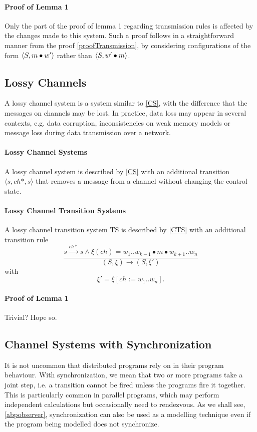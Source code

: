 \paragraph{Proof of Lemma 1}
Only the part of the proof of lemma 1 regarding transmission rules is affected by the changes made to this system. Such a proof follows in a straightforward manner from the proof \ref{proofTransmission}, by considering configurations of the form  $\langle S, m\bullet w'\rangle$ rather than $\langle S, w'\bullet m\rangle$.

\subsection{Lossy Channels}
A lossy channel system is a system similar to \ref{CS}, with the difference that the messages on channels may be lost. In practice, data loss may appear in several contexts, e.g. data corruption, inconsistencies on weak memory models or message loss during data transmission over a network.

\paragraph{Lossy Channel Systems}
A lossy channel system is described by \ref{CS} with an additional transition $\langle s, ch*, s\rangle$ that removes a message from a channel without changing the control state.

\paragraph{Lossy Channel Transition Systems}
A lossy channel transition system TS is described by \ref{CTS} with an additional transition rule
      \[
      \dfrac{s \xrightarrow{ch*} s \wedge \xi(ch) = w_1..w_{k-1}\bullet m \bullet w_{k+1}..w_n}{(S, \xi) \rightarrow (S, \xi')} \] with \[ \xi' = \xi[ch:= w_1..w_n].
      \]

\paragraph{Proof of Lemma 1}
Trivial?  Hope so.

\subsection{Channel Systems with Synchronization}
It is not uncommon that distributed programs rely on  in their program behaviour. With synchronization, we mean that two or more programs take a joint step, i.e. a transition cannot be fired unless the programs fire it together. This is particularly common in parallel programs, which may perform independent calculations but occasionally need to rendezvous. As we shall see, \ref{abpobserver}, synchronization can also be used as a modelling technique even if the program being modelled does not synchronize.

